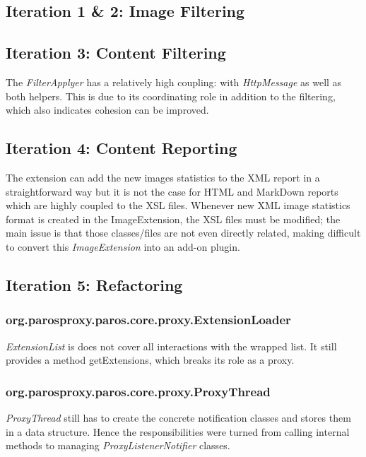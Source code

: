 \subsection{Iteration 1 \& 2: Image Filtering}
\subsection{Iteration 3: Content Filtering}
The \textit{FilterApplyer} has a relatively high coupling: with \textit{HttpMessage} as well as both helpers. This is due to its coordinating role in addition to the filtering, which also indicates cohesion can be improved.
\subsection{Iteration 4: Content Reporting}
The extension can add the new images statistics to the XML report in a straightforward way but it is not the case for HTML and MarkDown reports which are highly coupled to the XSL files. Whenever new XML image statistics format is created in the ImageExtension, the XSL files must be modified; the main issue is that those classes/files are not even directly related, making difficult to convert this \textit{ImageExtension} into an add-on plugin.

\subsection{Iteration 5: Refactoring}
\subsubsection{org.parosproxy.paros.core.proxy.ExtensionLoader}
\textit{ExtensionList} is does not cover all interactions with the wrapped list. It still provides a method getExtensions, which breaks its role as a proxy.
\subsubsection{org.parosproxy.paros.core.proxy.ProxyThread}

\textit{ProxyThread} still has to create the concrete notification classes and stores them in a data structure. Hence the responsibilities were turned from calling internal methods to managing \textit{ProxyListenerNotifier} classes.
